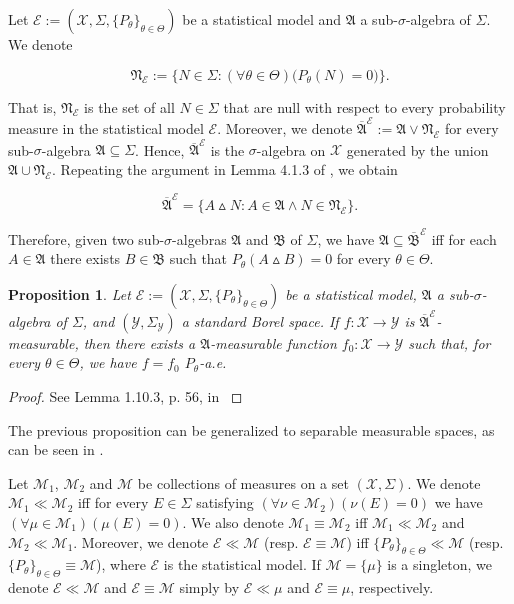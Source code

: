 \documentclass[12pt]{article}
\newtheorem{proposition}{Proposition}[section]
\begin{document}
Let $\mathcal{E}:=(\mathcal{X},\Sigma,\{P_\theta\}_{\theta\in\Theta})$ be a statistical model and $\mathfrak{A}$ a sub-$\sigma$-algebra of $\Sigma$. We denote 

$$\mathfrak{N}_\mathcal{E}:=\big\{N\in \Sigma :(\forall \theta\in\Theta )\big(P_\theta (N)=0\big)\big\}.$$

That is, $\mathfrak{N}_\mathcal{E}$ is the set of all $N\in \Sigma$ that are null with respect to every probability measure in the statistical model $\mathcal{E}$. Moreover, we denote $\overline{\mathfrak{A}}^\mathcal{E}:=\mathfrak{A}\vee \mathfrak{N}_\mathcal{E}$ for every sub-$\sigma$-algebra $\mathfrak{A}\subseteq\Sigma$. Hence, $\overline{\mathfrak{A}}^\mathcal{E}$ is the $\sigma$-algebra on $\mathcal{X}$ generated by the union $\mathfrak{A}\cup \mathfrak{N}_\mathcal{E}$. Repeating the argument in Lemma 4.1.3 of \cite{Doberkat2015}, we obtain 

$$\overline{\mathfrak{A}}^\mathcal{E}=\big\{A\vartriangle N:A\in\mathfrak{A}\wedge N\in\mathfrak{N}_\mathcal{E}\big\}.$$

Therefore, given two sub-$\sigma$-algebras $\mathfrak{A}$ and $\mathfrak{B}$ of $\Sigma$, we have $\mathfrak{A}\subseteq\overline{\mathfrak{B}}^\mathcal{E}$ iff for each $A\in\mathfrak{A}$ there exists $B\in\mathfrak{B}$ such that $P_\theta (A\vartriangle B)=0$ for every $\theta\in\Theta$.

\begin{proposition}
\label{prop:4.1}
Let $\mathcal{E}:=(\mathcal{X},\Sigma,\{P_\theta\}_{\theta\in\Theta})$ be a statistical model, $\mathfrak{A}$ a sub-$\sigma$-algebra of $\Sigma$, and $(\mathcal{Y},\Sigma_\mathcal{Y})$ a standard Borel space. If $f:\mathcal{X}\to \mathcal{Y}$ is $\overline{\mathfrak{A}}^\mathcal{E}$-measurable, then there exists a $\mathfrak{A}$-measurable function $f_0:\mathcal{X}\to\mathcal{Y}$ such that, for every $\theta\in\Theta$, we have $f=f_0$ $P_\theta$-a.e.
\end{proposition}

\begin{proof}
    See Lemma 1.10.3, p. 56, in \cite{Pfanzagl1994}
\end{proof}

The previous proposition can be generalized to separable measurable spaces, as can be seen in \citet[Proposition 2.1.4]{Cavalcante2026}.

Let $\mathcal{M}_1$, $\mathcal{M}_2$  and $\mathcal{M}$ be collections of measures on a set $(\mathcal{X},\Sigma )$. We denote $\mathcal{M}_1\ll \mathcal{M}_2$ iff for every $E\in \Sigma $ satisfying $(\forall \nu \in\mathcal{M}_2)(\nu (E)=0)$ we have $(\forall \mu \in\mathcal{M}_1)(\mu (E)=0)$. We also denote $\mathcal{M}_1\equiv \mathcal{M}_2$ iff $\mathcal{M}_1\ll \mathcal{M}_2$ and $\mathcal{M}_2\ll \mathcal{M}_1$. Moreover, we denote $\mathcal{E}\ll \mathcal{M}$ (resp. $\mathcal{E}\equiv \mathcal{M}$) iff $\{P_\theta \}_{\theta \in \Theta }\ll \mathcal{M}$ (resp. $\{P_\theta \}_{\theta \in \Theta }\equiv \mathcal{M}$), where $\mathcal{E}$ is the statistical model. If $\mathcal{M}=\{\mu\}$ is a singleton, we denote $\mathcal{E}\ll \mathcal{M}$ and $\mathcal{E}\equiv \mathcal{M}$ simply by $\mathcal{E}\ll \mu $ and $\mathcal{E}\equiv \mu $, respectively.
\end{document}
